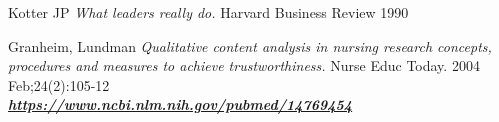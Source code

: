 \documentclass[12pt,a4paper,oneside]{article}
\begin{document}
\begin{thebibliography}{11}
Kotter JP \emph{What leaders really do.} Harvard Business Review 1990

Granheim, Lundman \emph{Qualitative content analysis in nursing research concepts, procedures and measures to achieve trustworthiness.} Nurse Educ Today. 2004 Feb;24(2):105-12 \\\textbf{\emph{\href{https://www.ncbi.nlm.nih.gov/pubmed/14769454}{\url{https://www.ncbi.nlm.nih.gov/pubmed/14769454}}}}



\end{thebibliography}
\end{document}

